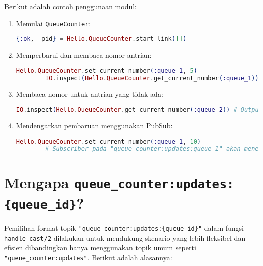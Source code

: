 Berikut adalah contoh penggunaan modul:
\begin{enumerate}
	\item Memulai \texttt{QueueCounter}:
	\begin{lstlisting}[language=Elixir]
		{:ok, _pid} = Hello.QueueCounter.start_link([])
	\end{lstlisting}
	
	\item Memperbarui dan membaca nomor antrian:
	\begin{lstlisting}[language=Elixir]
		Hello.QueueCounter.set_current_number(:queue_1, 5)
		IO.inspect(Hello.QueueCounter.get_current_number(:queue_1)) # Output: 5
	\end{lstlisting}
	
	\item Membaca nomor untuk antrian yang tidak ada:
	\begin{lstlisting}[language=Elixir]
		IO.inspect(Hello.QueueCounter.get_current_number(:queue_2)) # Output: 0
	\end{lstlisting}
	
	\item Mendengarkan pembaruan menggunakan PubSub:
	\begin{lstlisting}[language=Elixir]
		Hello.QueueCounter.set_current_number(:queue_1, 10)
		# Subscriber pada "queue_counter:updates:queue_1" akan menerima {:number_update, :queue_1, 10}
	\end{lstlisting}
\end{enumerate}

\section{Mengapa \texttt{queue\_counter:updates:\{queue\_id\}}?}

Pemilihan format topik \texttt{"queue\_counter:updates:\{queue\_id\}"} dalam fungsi \texttt{handle\_cast/2} dilakukan untuk mendukung skenario yang lebih fleksibel dan efisien dibandingkan hanya menggunakan topik umum seperti \texttt{"queue\_counter:updates"}. Berikut adalah alasannya:


